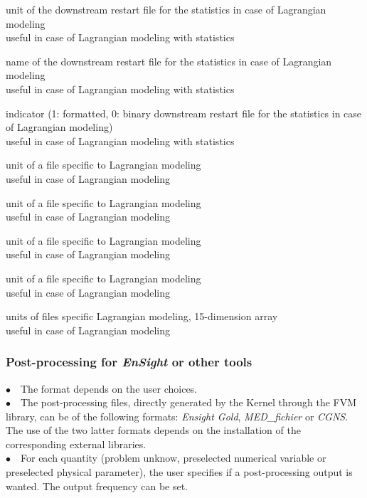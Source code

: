 {unit of the downstream restart file for the statistics in case of
Lagrangian modeling\\
useful in case of Lagrangian modeling with statistics}

{name of the downstream restart file for the statistics in case of
Lagrangian modeling\\
useful in case of Lagrangian modeling with statistics}

{indicator (1: formatted, 0: binary downstream restart file for the
statistics in case of Lagrangian modeling)\\ 
useful in case of Lagrangian modeling with statistics}

{unit of a file specific to Lagrangian modeling\\
useful in case of Lagrangian modeling}

{unit of a file specific to Lagrangian modeling\\ 
useful in case of Lagrangian modeling}

{unit of a file specific to Lagrangian modeling\\
useful in case of Lagrangian modeling}

{unit of a file specific to Lagrangian modeling\\
useful in case of Lagrangian modeling}

{units of files specific Lagrangian modeling, 15-dimension array\\
useful in case of Lagrangian modeling}


\subsubsection{Post-processing for {\em EnSight} or other tools}

$\bullet\quad$The format depends on the user choices.\\ 
$\bullet\quad$The post-processing files, directly generated by the Kernel
through the FVM library, can be of the following formats: {\em Ensight Gold},
{\em MED\_fichier} or {\em CGNS}. The use of the two latter formats depends on
the installation of the corresponding external libraries.\\
$\bullet\quad$For each quantity (problem unknow, preselected numerical
variable or preselected physical parameter), the user specifies if a
post-processing output is wanted. The output frequency can be set.\\


